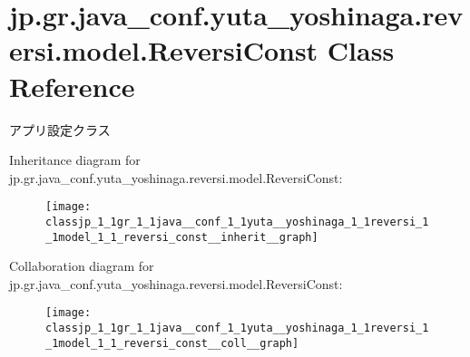 \hypertarget{classjp_1_1gr_1_1java__conf_1_1yuta__yoshinaga_1_1reversi_1_1model_1_1_reversi_const}{}\section{jp.\+gr.\+java\+\_\+conf.\+yuta\+\_\+yoshinaga.\+reversi.\+model.\+Reversi\+Const Class Reference}
\label{classjp_1_1gr_1_1java__conf_1_1yuta__yoshinaga_1_1reversi_1_1model_1_1_reversi_const}


アプリ設定クラス  




Inheritance diagram for jp.\+gr.\+java\+\_\+conf.\+yuta\+\_\+yoshinaga.\+reversi.\+model.\+Reversi\+Const\+:\nopagebreak
\begin{figure}[H]
\begin{center}
\leavevmode
\texttt{[image: classjp\_1\_1gr\_1\_1java\_\_conf\_1\_1yuta\_\_yoshinaga\_1\_1reversi\_1\_1model\_1\_1\_reversi\_const\_\_inherit\_\_graph]}
\end{center}
\end{figure}


Collaboration diagram for jp.\+gr.\+java\+\_\+conf.\+yuta\+\_\+yoshinaga.\+reversi.\+model.\+Reversi\+Const\+:\nopagebreak
\begin{figure}[H]
\begin{center}
\leavevmode
\texttt{[image: classjp\_1\_1gr\_1\_1java\_\_conf\_1\_1yuta\_\_yoshinaga\_1\_1reversi\_1\_1model\_1\_1\_reversi\_const\_\_coll\_\_graph]}
\end{center}
\end{figure}
